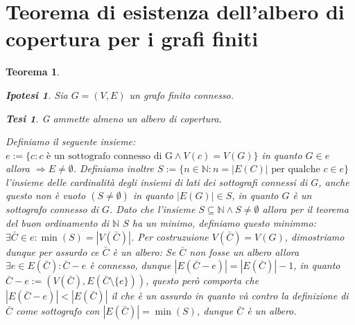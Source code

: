 \documentclass{article}
\makeatletter
\renewenvironment{proof}[1][\proofname]{\par
    \pushQED{\qed}%
    \normalfont \topsep6\p@\@plus6\p@\relax
    \trivlist
    \item\relax
    {\itshape
    #1\@addpunct{.}}\hspace\labelsep\ignorespaces
    }{%
    \popQED\endtrivlist\@endpefalse
}
\newtheorem{theorem}{Teorema}[part]
\newtheorem{ipothesis}[lemma]{Ipotesi}
\newtheorem{thesis}[lemma]{Tesi}
\theoremstyle{definition}
\newcommand{\N}{\mathbb{N}}
\makeatother
\begin{document}
    \section{Teorema di esistenza dell'albero di copertura per i grafi finiti}
        \begin{theorem}
            \begin{ipothesis}
                Sia \(G=(V,E)\) un grafo finito connesso.
            \end{ipothesis}
            \begin{thesis}
                G ammette almeno un albero di copertura.
            \end{thesis}
            \begin{proof}
                Definiamo il seguente insieme:\(e:=\{c:c\text{ è un sottografo connesso di G} \land V(c)=V(G)\}\) in quanto \(G\in e\) allora \(\Rightarrow E\neq \emptyset\). Definiamo inoltre \(S:=\{n\in\N: n=|E(C)| \text{ per qualche } c\in e\}\) l'insieme delle cardinalità degli insiemi di lati dei sottografi connessi di \(G\), anche questo non è vuoto \((S\neq \emptyset)\) in quanto \(|E(G)|\in S\), in quanto \(G\) è un sottografo connesso di \(G\).
                Dato che l'insieme \(S\subseteq \N\land S\neq \emptyset\) allora per il teorema del buon ordinamento di \(\N\) \(S\) ha un minimo, definiamo questo minimmo: \(\exists\bar{C}\in e: \min(S)=\left|V(\bar{C})\right|\).
                Per costruzuione \(V(\bar{C})=V(G)\), dimostriamo dunque per assurdo ce \(\bar{C}\) è un albero:
                Se \(\bar{C}\) non fosse un albero allora \(\exists e\in E(\bar{C}):\bar{C}-e\)  è connesso, dunque \(\left|E(\bar{C}-e)\right|=\left|E(\bar{C})\right|-1\), in quanto \(\bar{C}-e:=(V(\bar{C}),E(\bar{C}\setminus \{e\}))\), questo però comporta che \(\left|E(\bar{C}-e)\right|<\left|E(\bar{C})\right|\) il che è un assurdo in quanto và contro la definizione di \(\bar{C}\) come sottografo con \(\left|E(\bar{C})\right|=\min(S)\), dunque \(\bar{C}\) è un albero.
                \pushQED{}
            \end{proof}
            \raggedleft{{\ensuremath{\blacksquare}}}
        \end{theorem}
\end{document}
